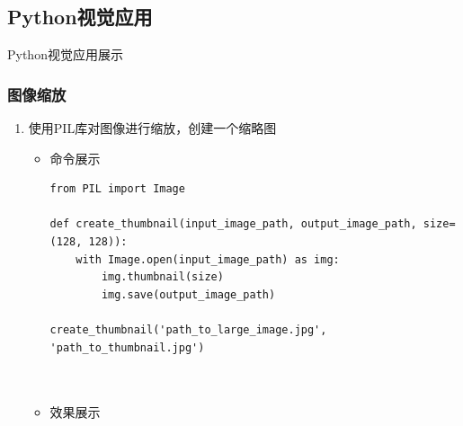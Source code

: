 \documentclass[UTF8]{ctexart}
\begin{document}
  \subsection{Python视觉应用}
  {\color{blue}Python视觉应用展示}






\subsubsection{图像缩放}

\begin{enumerate}
  \item 使用PIL库对图像进行缩放，创建一个缩略图
  \begin{itemize}
  \item 命令展示
  \begin{verbatim}
from PIL import Image

def create_thumbnail(input_image_path, output_image_path, size=(128, 128)):
    with Image.open(input_image_path) as img:
        img.thumbnail(size)
        img.save(output_image_path)

create_thumbnail('path_to_large_image.jpg', 'path_to_thumbnail.jpg')

    
  \end{verbatim}

\item 效果展示
 

\end{itemize}
\end{enumerate}
\end{document}

